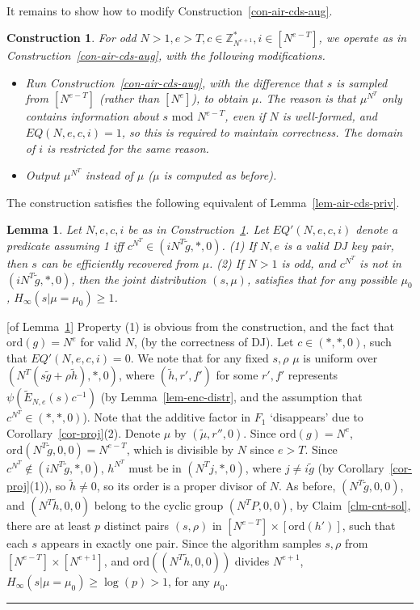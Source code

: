 \documentclass[11pt]{article}
\newtheorem{lemma}[theorem]{Lemma}
\newenvironment{proof}{\noindent {\bf Proof:} \hspace{.677em}}%
                     {\qed}
\newcommand{\qed}{\hspace*{\fill}\rule{0.6em}{0.6em}}
\newtheorem{construction}[theorem]{Construction}
\newcommand{\encdjnr}{{\tilde{E}}_{N,e}}
\newcommand{\U}[1]{\mathbb{Z}_{#1}^*}
\newcommand{\order}{{\mathrm{ord}}}
\renewcommand{\mod}{{\,\,\mathrm{mod}\,\,}}
\begin{document}
\paragraph{} It remains to show how to modify Construction~\ref{con-air-cds-aug}.
\begin{construction}
\label{con-air-cds-aug2}
For odd $N>1,e>T,c\in\U{N^{e+1}},i\in[N^{e-T}]$, we operate as in Construction~\ref{con-air-cds-aug},
with the following modifications.
\begin{itemize}
\item Run Construction~\ref{con-air-cds-aug}, with the difference that $s$ is sampled from $[N^{e-T}]$
(rather than $[N^e]$), to obtain $\mu$. The reason is that
$\mu^{N^T}$ only contains information about $s\mod N^{e-T}$, even
if $N$ is well-formed, and $EQ(N,e,c,i)=1$, so this is required to
maintain correctness. The domain of $i$ is restricted for the same
reason.
\item Output $\mu^{N^T}$ instead of $\mu$ ($\mu$ is computed as before).
\end{itemize}
\end{construction}
The construction satisfies the following equivalent of Lemma~\ref{lem-air-cds-priv}.
\begin{lemma}
\label{lem-aug-air-cds-priv}
Let $N,e,c,i$ be as in Construction~\ref{con-air-cds-aug2}.
Let $EQ'(N,e,c,i)$ denote a predicate assuming 1 iff $c^{N^T}\in(iN^T\tilde{g},*,0)$.
(1) If $N,e$ is a valid DJ key pair, then $s$ can be efficiently recovered from $\mu$.
(2) If $N>1$ is odd, and $c^{N^T}$ is not in $(iN^T\tilde{g},*,0)$, then the joint distribution
$(s,\mu)$, satisfies that for any possible $\mu_0$, $H_{\infty}(s|\mu=\mu_0)\geq 1$.
\end{lemma}
\begin{proof}[of Lemma~\ref{lem-aug-air-cds-priv}]
Property (1) is obvious from the construction, and the fact that
$\order(g)=N^e$ for valid $N$, (by the correctness of DJ). Let $c\in
(*,*,0)$, such that $EQ'(N,e,c,i)=0$. We note that for any fixed
$s,\rho$ $\mu$ is uniform over $(N^T(s\tilde{g}+\rho
\tilde{h}),*,0)$, where $(\tilde{h},r',f')$ for some $r',f'$
represents $\psi(\encdjnr(s)c^{-1})$ (by Lemma~\ref{lem-enc-distr},
and the assumption that $c^{N^T}\in(*,*,0)$). Note that the additive
factor in $F_1$ `disappears' due to Corollary~\ref{cor-proj}(2).
Denote $\mu$ by $(\tilde{\mu},r'',0)$. Since $\order(g)=N^e$,
$\order(N^T\tilde{g},0,0)=N^{e-T}$, which is divisible by $N$ since
$e>T$. Since $c^{N^T}\notin(iN^T\tilde{g},*,0)$, $h^{N^T}$ must be
in $(N^Tj,*,0)$, where $j\neq i\tilde{g}$ (by
Corollary~\ref{cor-proj}(1)), so $\tilde{h}\neq 0$, so its order is
a proper divisor of $N$. As before, $(N^T\tilde{g},0,0)$, and
$(N^T\tilde{h},0,0)$ belong to the cyclic group $(N^TP,0,0)$, by
Claim~\ref{clm-cnt-sol}, there are at least $p$ distinct pairs
$(s,\rho)$ in $[N^{e-T}]\times[\order(h')]$, such that each $s$
appears in exactly one pair. Since the algorithm samples $s,\rho$
from $[N^{e-T}]\times[N^{e+1}]$, and $\order((N^T\tilde{h},0,0))$
divides $N^{e+1}$, $H_{\infty}(s|\mu=\mu_0)\geq \log(p)>1$, for any
$\mu_0$.
\end{proof}
\end{document}
